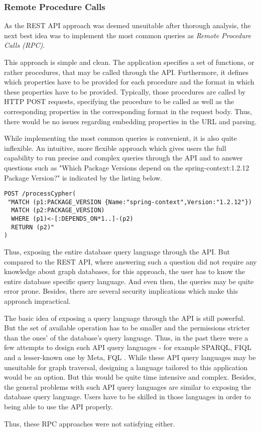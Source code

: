 \subsubsection{Remote Procedure Calls}
As the REST API approach was deemed unsuitable after thorough analysis, the next best idea was to implement the most common queries as \emph{Remote Procedure Calls (RPC)}.\par 
This approach is simple and clean. The application specifies a set of functions, or rather procedures, that may be called through the API. Furthermore, it defines which properties have to be provided for each procedure and the format in which these properties have to be provided. Typically, those procedures are called by HTTP POST requests, specifying the procedure to be called as well as the corresponding properties in the corresponding format in the request body. Thus, there would be no issues regarding embedding properties in the URL and parsing.\par
While implementing the most common queries is convenient, it is also quite inflexible. An intuitive, more flexible approach which gives users the full capability to run precise and complex queries through the API and to answer questions such as "Which Package Versions depend on the spring-context:1.2.12 Package Version?" is indicated by the listing below.

\begin{lstlisting}[caption=Exposing Cypher through API, captionpos=b, label=lst:CypherThroughAPI]
POST /processCypher(
 "MATCH (p1:PACKAGE_VERSION {Name:"spring-context",Version:"1.2.12"})
  MATCH (p2:PACKAGE_VERSION)
  WHERE (p1)<-[:DEPENDS_ON*1..]-(p2)
  RETURN (p2)"
)
\end{lstlisting}

Thus, exposing the entire database query language through the API. But compared to the REST API, where answering such a question did not require any knowledge about graph databases, for this approach, the user has to know the entire database specific query language. And even then, the queries may be quite error prone. Besides, there are several security implications which make this approach impractical.\par
The basic idea of exposing a query language through the API is still powerful. But the set of available operation has to be smaller and the permissions stricter than the ones' of the database's query language. Thus, in the past there were a few attempts to design such API query languages - for example SPARQL, FIQL and a lesser-known one by Meta, FQL \cite{APIYouWontHate}. While these API query languages may be unsuitable for graph traversal, designing a language tailored to this application would be an option. But this would be quite time intensive and complex. Besides, the general problems with such API query languages are similar to exposing the database query language. Users have to be skilled in those languages in order to being able to use the API properly.\par
Thus, these RPC approaches were not satisfying either.

